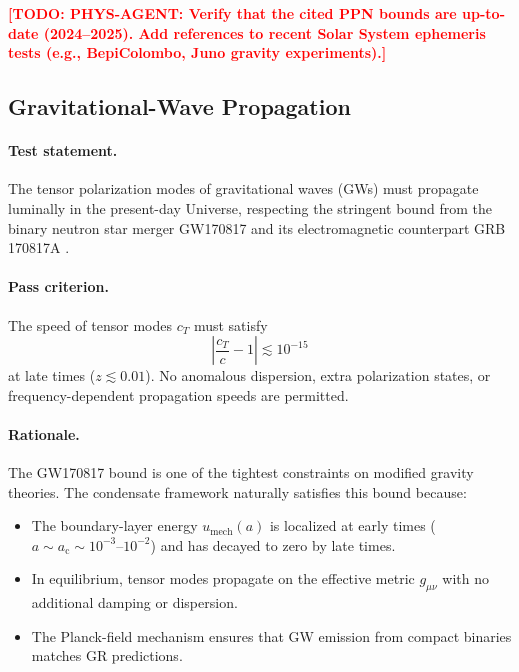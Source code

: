 \documentclass[11pt,a4paper]{article}
\newcommand{\ac}{a_{\mathrm{c}}}
\newcommand{\umech}{u_{\mathrm{mech}}}
\theoremstyle{definition}
\newcommand{\TODO}[1]{\textcolor{red}{\textbf{[TODO: #1]}}}
\begin{document}
\TODO{PHYS-AGENT: Verify that the cited PPN bounds are up-to-date (2024--2025). Add references to recent Solar System ephemeris tests (e.g., BepiColombo, Juno gravity experiments).}

\subsection{Gravitational-Wave Propagation}
\label{sec:GW_prop}

\paragraph{Test statement.}
The tensor polarization modes of gravitational waves (GWs) must propagate luminally in the present-day Universe, respecting the stringent bound from the binary neutron star merger GW170817 and its electromagnetic counterpart GRB 170817A \cite{GW170817}.

\paragraph{Pass criterion.}
The speed of tensor modes $c_T$ must satisfy
\begin{equation}
\label{eq:cT_bound}
\left| \frac{c_T}{c} - 1 \right| \lesssim 10^{-15}
\end{equation}
at late times ($z \lesssim 0.01$). No anomalous dispersion, extra polarization states, or frequency-dependent propagation speeds are permitted.

\paragraph{Rationale.}
The GW170817 bound is one of the tightest constraints on modified gravity theories. The condensate framework naturally satisfies this bound because:
\begin{itemize}[leftmargin=1.8em]
  \item The boundary-layer energy $\umech(a)$ is localized at early times ($a \sim \ac \sim 10^{-3}$--$10^{-2}$) and has decayed to zero by late times.
  \item In equilibrium, tensor modes propagate on the effective metric $g_{\mu\nu}$ with no additional damping or dispersion.
  \item The Planck-field mechanism \cite{SkavbergPlanckField2025} ensures that GW emission from compact binaries matches GR predictions.
\end{itemize}
\end{document}
